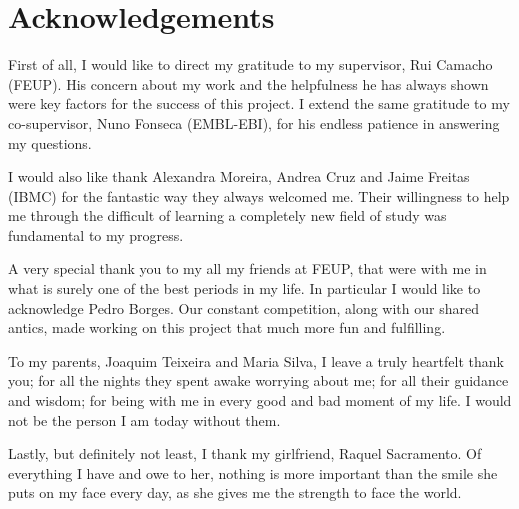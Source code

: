 \chapter*{Acknowledgements}

First of all, I would like to direct my gratitude to my supervisor, Rui Camacho
(FEUP). His concern about my work and the helpfulness he has always shown were
key factors for the success of this project. I extend the same gratitude to my
co-supervisor, Nuno Fonseca (EMBL-EBI), for his endless patience in answering my
questions.

I would also like thank Alexandra Moreira, Andrea Cruz and Jaime Freitas (IBMC)
for the fantastic way they always welcomed me. Their willingness to help me
through the difficult of learning a completely new field of study was
fundamental to my progress.

A very special thank you to my all my friends at FEUP, that were with me in what
is surely one of the best periods in my life. In particular I would like to
acknowledge Pedro Borges. Our constant competition, along with our shared
antics, made working on this project that much more fun and fulfilling.

To my parents, Joaquim Teixeira and Maria Silva, I leave a truly heartfelt thank
you; for all the nights they spent awake worrying about me; for all their
guidance and wisdom; for being with me in every good and bad moment of my life.
I would not be the person I am today without them.

Lastly, but definitely not least, I thank my girlfriend, Raquel Sacramento. Of
everything I have and owe to her, nothing is more important than the smile she
puts on my face every day, as she gives me the strength to face the world.

\vspace{10mm}
